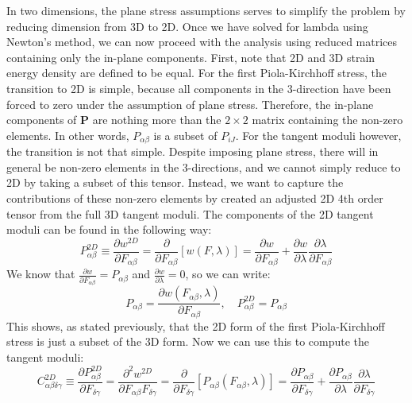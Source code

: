 \documentclass[]{spie}  %
\begin{document}
In two dimensions, the plane stress assumptions serves to simplify the problem by reducing dimension from 3D to 2D. Once we have solved for lambda using Newton's method, we can now proceed with the analysis using reduced matrices containing only the in-plane components. First, note that 2D and 3D strain energy density are defined to be equal. For the first Piola-Kirchhoff stress, the transition to 2D is simple, because all components in the 3-direction have been forced to zero under the assumption of plane stress. Therefore, the in-plane components of $\bm{P}$ are nothing more than the $2 \times 2$ matrix containing the non-zero elements. In other words, $P_{\alpha\beta}$ is a subset of $P_{iJ}$. For the tangent moduli however, the transition is not that simple. Despite imposing plane stress, there will in general be non-zero elements in the 3-directions, and we cannot simply reduce to 2D by taking a subset of this tensor. Instead, we want to capture the contributions of these non-zero elements by created an adjusted 2D 4th order tensor from the full 3D tangent moduli. The components of the 2D tangent moduli can be found in the following way:
\begin{equation}
P^{2D}_{\alpha\beta} \equiv \frac{\partial w^{2D}}{\partial F_{\alpha\beta}} = \frac{\partial}{\partial F_{\alpha\beta}}
\left[ w(F, \lambda) \right] = \frac{\partial w}{\partial F_{\alpha\beta}} + \frac{\partial w}{\partial \lambda} \frac{\partial \lambda}{\partial F_{\alpha\beta}}
\end{equation}
We know that $\frac{\partial w}{\partial F_{\alpha\beta}} = P_{\alpha\beta}$ and $\frac{\partial w}{\partial \lambda} = 0$, so we can write:
\begin{equation}
P_{\alpha\beta} = \frac{\partial w(F_{\alpha\beta}, \lambda)}{\partial F_{\alpha\beta}}, \quad P^{2D}_{\alpha\beta} = P_{\alpha\beta}
\end{equation}
This shows, as stated previously, that the 2D form of the first Piola-Kirchhoff stress is just a subset of the 3D form. Now we can use this to compute the tangent moduli:
\begin{equation}
C^{2D}_{\alpha\beta\delta\gamma}	\equiv \frac{\partial P^{2D}_{\alpha\beta}}{\partial F_{\delta\gamma}} =
\frac{\partial^2 w^{2D}}{\partial F_{\alpha\beta}F_{\delta\gamma}} =
\frac{\partial}{\partial F_{\delta\gamma}} \left[P_{\alpha\beta}(F_{\alpha\beta}, \lambda)\right] =
\frac{\partial P_{\alpha\beta}}{\partial F_{\delta\gamma}} + \frac{\partial P_{\alpha\beta}}{\partial \lambda} \frac{\partial \lambda}{\partial F_{\delta\gamma}}
\end{equation}
\end{document}
